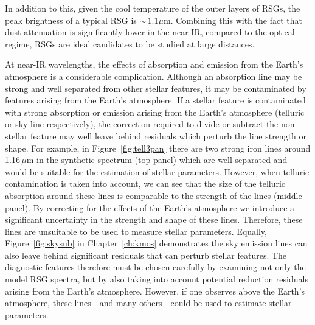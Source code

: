 In addition to this, given the cool temperature of the outer layers of RSGs,
the peak brightness of a typical RSG is $\sim\,1.1\mu$m.
Combining this with the fact that dust attenuation is significantly lower in the near-IR, compared to the optical regime, RSGs are ideal candidates to be studied at large distances.

At near-IR wavelengths, the effects of absorption and emission from the Earth's atmosphere is a considerable complication.
Although an absorption line may be strong and well separated from other stellar features, it may be contaminated by features arising from the Earth's atmosphere.
If a stellar feature is contaminated with strong absorption or emission arising from the Earth's atmosphere (telluric or sky line respectively), the correction required to divide or subtract the non-stellar feature may well leave behind residuals which perturb the line strength or shape.
For example, in Figure~\ref{fig:tell3pan} there are two strong iron lines around 1.16\,$\mu$m in the synthetic spectrum (top panel) which are well separated and would be suitable for the estimation of stellar parameters.
However, when telluric contamination is taken into account, we can see that the size of the telluric absorption around these lines is comparable to the strength of the lines (middle panel).
By correcting for the effects of the Earth's atmosphere we introduce a significant uncertainty in the strength and shape of these lines.
Therefore, these lines are unsuitable to be used to measure stellar parameters.
Equally, Figure~\ref{fig:skysub} in Chapter~\ref{ch:kmos} demonstrates the sky emission lines can also leave behind significant residuals that can perturb stellar features.
The diagnostic features therefore must be chosen carefully by examining not only the model RSG spectra, but by also taking into account potential reduction residuals arising from the Earth's atmosphere.
However, if one observes above the Earth's atmosphere, these lines - and many others - could be used to estimate stellar parameters.

